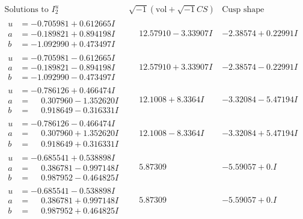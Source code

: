 \documentclass[1p]{elsarticle_modified}
\theoremstyle{definition}
\newcommand{\I}{\sqrt{-1}}
\begin{document}
$$\begin{array}{c|c|c}  
\text{Solutions to }I^u_{2}& \I (\text{vol} + \sqrt{-1}CS) & \text{Cusp shape}\\
 \hline 
\begin{aligned}
u &= -0.705981 + 0.612665 I \\
a &= -0.189821 + 0.894198 I \\
b &= -1.092990 + 0.473497 I\end{aligned}
 & \phantom{-}12.57910 - 3.33907 I & -2.38574 + 0.22991 I \\ \hline\begin{aligned}
u &= -0.705981 - 0.612665 I \\
a &= -0.189821 - 0.894198 I \\
b &= -1.092990 - 0.473497 I\end{aligned}
 & \phantom{-}12.57910 + 3.33907 I & -2.38574 - 0.22991 I \\ \hline\begin{aligned}
u &= -0.786126 + 0.466474 I \\
a &= \phantom{-}0.307960 - 1.352620 I \\
b &= \phantom{-}0.918649 - 0.316331 I\end{aligned}
 & \phantom{-}12.1008 + 8.3364 I & -3.32084 - 5.47194 I \\ \hline\begin{aligned}
u &= -0.786126 - 0.466474 I \\
a &= \phantom{-}0.307960 + 1.352620 I \\
b &= \phantom{-}0.918649 + 0.316331 I\end{aligned}
 & \phantom{-}12.1008 - 8.3364 I & -3.32084 + 5.47194 I \\ \hline\begin{aligned}
u &= -0.685541 + 0.538898 I \\
a &= \phantom{-}0.386781 - 0.997148 I \\
b &= \phantom{-}0.987952 - 0.464825 I\end{aligned}
 & \phantom{-}5.87309\phantom{ +0.000000I} & -5.59057 + 0. I\phantom{ +0.000000I} \\ \hline\begin{aligned}
u &= -0.685541 - 0.538898 I \\
a &= \phantom{-}0.386781 + 0.997148 I \\
b &= \phantom{-}0.987952 + 0.464825 I\end{aligned}
 & \phantom{-}5.87309\phantom{ +0.000000I} & -5.59057 + 0. I\phantom{ +0.000000I} \\ \hline\begin{aligned}

\end{aligned}
\end{array}$$
\end{document}
